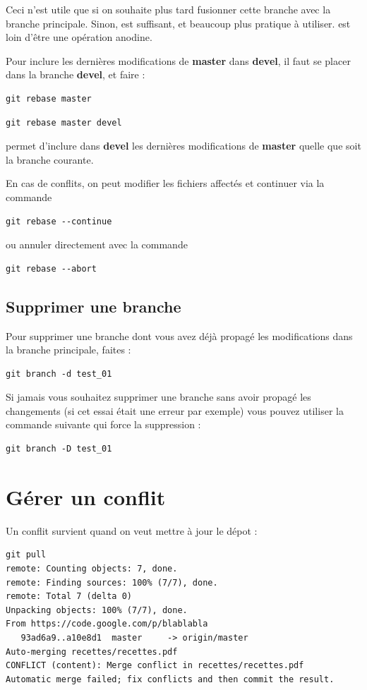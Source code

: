 \documentclass[a4paper,twoside]{article}
\begin{document}
\begin{attention}
Ceci n'est utile que si on souhaite plus tard fusionner cette branche avec la branche principale. Sinon,  est suffisant, et beaucoup plus pratique à utiliser.  est loin d'être une opération anodine.
\end{attention}

Pour inclure les dernières modifications de \textbf{master} dans \textbf{devel}, il faut se placer dans la branche \textbf{devel}, et faire :
\begin{verbatim}
git rebase master
\end{verbatim}


\begin{verbatim}
git rebase master devel
\end{verbatim}
permet d'inclure dans \textbf{devel} les dernières modifications de \textbf{master} quelle que soit la branche courante.
\bigskip

En cas de conflits, on peut modifier les fichiers affectés et continuer via la commande 
\begin{verbatim}
git rebase --continue
\end{verbatim}
ou annuler directement avec la commande
\begin{verbatim}
git rebase --abort
\end{verbatim}

\subsection{Supprimer une branche}
Pour supprimer une branche dont vous avez déjà propagé les modifications dans la branche principale, faites : 
\begin{verbatim}
git branch -d test_01
\end{verbatim}

Si jamais vous souhaitez supprimer une branche sans avoir propagé les changements (si cet essai était une erreur par exemple) vous pouvez utiliser la commande suivante qui force la suppression : 
\begin{verbatim}
git branch -D test_01
\end{verbatim}

\section{Gérer un conflit}
Un conflit survient quand on veut mettre à jour le dépot : 
\begin{verbatim}
git pull
remote: Counting objects: 7, done.
remote: Finding sources: 100% (7/7), done.
remote: Total 7 (delta 0)
Unpacking objects: 100% (7/7), done.
From https://code.google.com/p/blablabla
   93ad6a9..a10e8d1  master     -> origin/master
Auto-merging recettes/recettes.pdf
CONFLICT (content): Merge conflict in recettes/recettes.pdf
Automatic merge failed; fix conflicts and then commit the result.
\end{verbatim}
\end{document}
